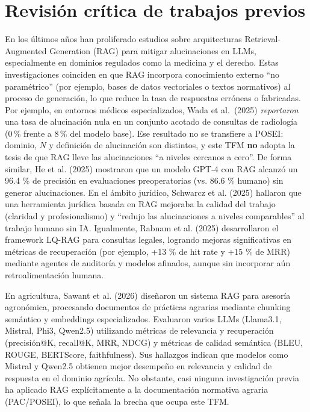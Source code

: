 \section{Revisión crítica de trabajos previos}
En los últimos años han proliferado estudios sobre arquitecturas Retrieval-Augmented Generation (RAG) para mitigar alucinaciones en LLMs, especialmente en dominios regulados como la medicina y el derecho. Estas investigaciones coinciden en que RAG incorpora conocimiento externo ``no paramétrico'' (por ejemplo, bases de datos vectoriales o textos normativos) al proceso de generación, lo que reduce la tasa de respuestas erróneas o fabricadas. Por ejemplo, en entornos médicos especializados, Wada et al.\ (2025) \emph{reportaron} una tasa de alucinación nula en un conjunto acotado de consultas de radiología (0\,\% frente a 8\,\% del modelo base). Ese resultado no se transfiere a POSEI: dominio, $N$ y definición de alucinación son distintos, y este TFM \textbf{no} adopta la tesis de que RAG lleve las alucinaciones ``a niveles cercanos a cero''. De forma similar, He et al. (2025) mostraron que un modelo GPT-4 con RAG alcanzó un 96.4 \% de precisión en evaluaciones preoperatorias (vs. 86.6 \% humano) sin generar alucinaciones. En el ámbito jurídico, Schwarcz et al. (2025) hallaron que una herramienta jurídica basada en RAG mejoraba la calidad del trabajo (claridad y profesionalismo) y ``redujo las alucinaciones a niveles comparables'' al trabajo humano sin IA. Igualmente, Rabnam et al. (2025) desarrollaron el framework LQ-RAG para consultas legales, logrando mejoras significativas en métricas de recuperación (por ejemplo, +13 \% de hit rate y +15 \% de MRR) mediante agentes de auditoría y modelos afinados, aunque sin incorporar aún retroalimentación humana.

En agricultura, Sawant et al. (2026) diseñaron un sistema RAG para asesoría agronómica, procesando documentos de prácticas agrarias mediante chunking semántico y embeddings especializados. Evaluaron varios LLMs (Llama3.1, Mistral, Phi3, Qwen2.5) utilizando métricas de relevancia y recuperación (precisión@K, recall@K, MRR, NDCG) y métricas de calidad semántica (BLEU, ROUGE, BERTScore, faithfulness). Sus hallazgos indican que modelos como Mistral y Qwen2.5 obtienen mejor desempeño en relevancia y calidad de respuesta en el dominio agrícola. No obstante, casi ninguna investigación previa ha aplicado RAG explícitamente a la documentación normativa agraria (PAC/POSEI), lo que señala la brecha que ocupa este TFM.

